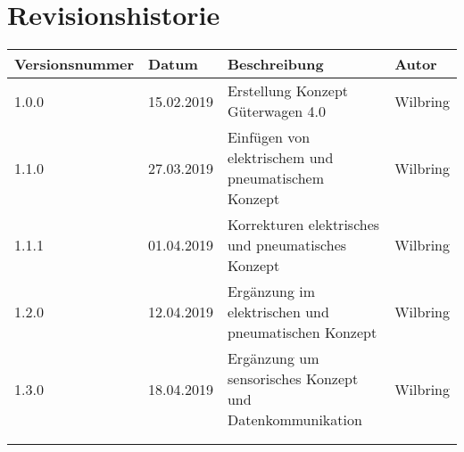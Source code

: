 \section*{Revisionshistorie}
\begin{tabular}{|p{3cm}|p{2cm}|p{6cm}|p{2cm}|}
\hline
Versionsnummer  & Datum         & Beschreibung          & Autor     \\
\hline
 1.0.0          & 15.02.2019    & Erstellung Konzept Güterwagen 4.0 & Wilbring  \\\hline
 1.1.0          & 27.03.2019    & Einfügen von elektrischem und pneumatischem Konzept & Wilbring \\\hline
 1.1.1          & 01.04.2019    & Korrekturen elektrisches und pneumatisches Konzept  & Wilbring  \\\hline
 1.2.0           & 12.04.2019   & Ergänzung im elektrischen und pneumatischen Konzept & Wilbring  \\ \hline
 1.3.0          & 18.04.2019    & Ergänzung um sensorisches Konzept und Datenkommunikation & Wilbring \\\hline
                &               &                       &           \\\hline
                &               &                       &           \\\hline
\end{tabular}